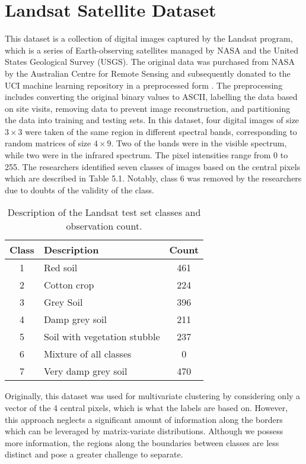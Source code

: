 \documentclass[12pt]{report}
\begin{document}
\section{Landsat Satellite Dataset}
This dataset is a collection of digital images captured by the Landsat program, which is a series of Earth-observing satellites managed by NASA and the United States Geological Survey (USGS). The original data was purchased from NASA by the Australian Centre for Remote Sensing and subsequently donated to the UCI machine learning repository in a preprocessed form \citep{landsat}. The preprocessing includes converting the original binary values to ASCII, labelling the data based on site visits, removing data to prevent image reconstruction, and partitioning the data into training and testing sets. In this dataset, four digital images of size $3 \times 3$ were taken of the same region in different spectral bands, corresponding to random matrices of size $4\times 9$. Two of the bands were in the visible spectrum, while two were in the infrared spectrum. The pixel intensities range from 0 to 255. The researchers identified seven classes of images based on the central pixels which are described in Table 5.1. Notably, class 6 was removed by the researchers due to doubts of the validity of the class.

\begin{table}[!htbp]
  \caption{Description of the Landsat test set classes and observation count.}
  \vspace{0.5cm}
  \begin{tabularx}{\textwidth}{cXc}
    \toprule
    \textbf{Class} & \textbf{Description} & \textbf{Count} \\
    \midrule
    1 & Red soil                        & 461 \\
    2 & Cotton crop                     & 224 \\
    3 & Grey Soil                       & 396 \\
    4 & Damp grey soil                  & 211 \\
    5 & Soil with vegetation stubble    & 237 \\
    6 & Mixture of all classes          & 0 \\
    7 & Very damp grey soil             & 470 \\
    \bottomrule
  \end{tabularx}
\end{table}

Originally, this dataset was used for multivariate clustering by considering only a vector of the 4 central pixels, which is what the labels are based on. However, this approach neglects a significant amount of information along the borders which can be leveraged by matrix-variate distributions. Although we possess more information, the regions along the boundaries between classes are less distinct and pose a greater challenge to separate.
 
\end{document}
